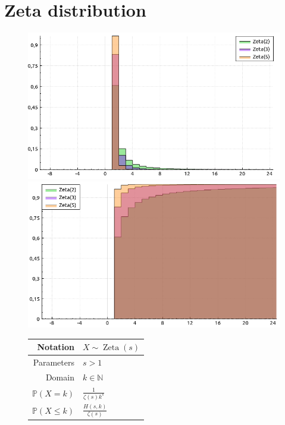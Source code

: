 \documentclass[a4paper,11pt]{article}
\theoremstyle{plain}
\theoremstyle{definition}
\newcommand{\MP}{\mathbb{P}}
\newcommand{\MN}{\mathbb{N}}
\begin{document}
	\section{Zeta distribution}
		\begin{figure}[!htb]\centering
			\begin{minipage}{0.55\textwidth}
				\includegraphics[width=\linewidth, right]{zeta_pmf}
				\captionsetup{labelformat=empty}
				\includegraphics[width=\linewidth, right]{zeta_cdf}
				\captionsetup{labelformat=empty}
			\end{minipage}
			\begin{minipage}{0.4\textwidth}
				\begin{tabular}{| r | l |}
					\hline
					Notation & $ X \sim \operatorname{Zeta}(s) $ \\
					\hline
					Parameters & $s > 1$ \\
					\hline
					Domain & $ k \in \MN $  \\
					\hline
					$\MP(X = k)$ & $ \frac{1}{\zeta(s) k^s} $ \\
					\hline
					$\MP(X \leq k)$ & $ \frac{H(s, k)}{\zeta(s)} $ \\

\end{tabular}
\end{minipage}
\end{figure}
\end{document}
